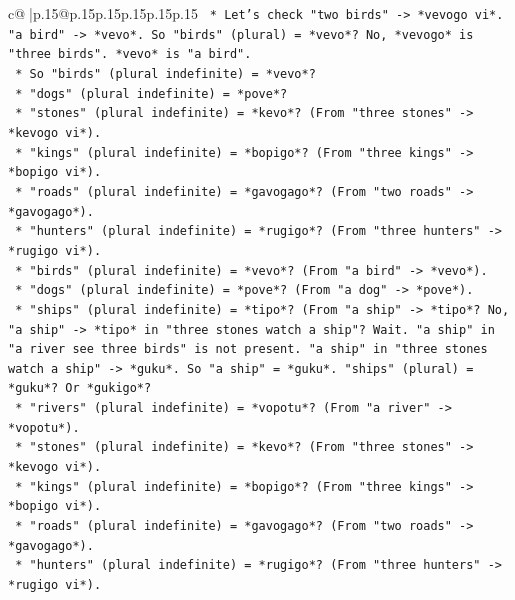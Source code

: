 \documentclass{article}
\begin{document}
{\begin{supertabular}{c@{$\;$}|p{.15\linewidth}@{}p{.15\linewidth}p{.15\linewidth}p{.15\linewidth}p{.15\linewidth}p{.15\linewidth}}
{{{\texttt{                                *   Let's check "two birds" {-}> *vevogo vi*. "a bird" {-}> *vevo*. So "birds" (plural) = *vevo*? No, *vevogo* is "three birds". *vevo* is "a bird".} \\
\texttt{                                *   So "birds" (plural indefinite) = *vevo*?} \\
\texttt{                                *   "dogs" (plural indefinite) = *pove*?} \\
\texttt{                                *   "stones" (plural indefinite) = *kevo*? (From "three stones" {-}> *kevogo vi*).} \\
\texttt{                                *   "kings" (plural indefinite) = *bopigo*? (From "three kings" {-}> *bopigo vi*).} \\
\texttt{                                *   "roads" (plural indefinite) = *gavogago*? (From "two roads" {-}> *gavogago*).} \\
\texttt{                                *   "hunters" (plural indefinite) = *rugigo*? (From "three hunters" {-}> *rugigo vi*).} \\
\texttt{                                *   "birds" (plural indefinite) = *vevo*? (From "a bird" {-}> *vevo*).} \\
\texttt{                                *   "dogs" (plural indefinite) = *pove*? (From "a dog" {-}> *pove*).} \\
\texttt{                                *   "ships" (plural indefinite) = *tipo*? (From "a ship" {-}> *tipo*? No, "a ship" {-}> *tipo* in "three stones watch a ship"? Wait. "a ship" in "a river see three birds" is not present. "a ship" in "three stones watch a ship" {-}> *guku*. So "a ship" = *guku*. "ships" (plural) = *guku*? Or *gukigo*?} \\
\texttt{                                *   "rivers" (plural indefinite) = *vopotu*? (From "a river" {-}> *vopotu*).} \\
\texttt{                                *   "stones" (plural indefinite) = *kevo*? (From "three stones" {-}> *kevogo vi*).} \\
\texttt{                                *   "kings" (plural indefinite) = *bopigo*? (From "three kings" {-}> *bopigo vi*).} \\
\texttt{                                *   "roads" (plural indefinite) = *gavogago*? (From "two roads" {-}> *gavogago*).} \\
\texttt{                                *   "hunters" (plural indefinite) = *rugigo*? (From "three hunters" {-}> *rugigo vi*).} \\
}}}
\end{supertabular}}
\end{document}

